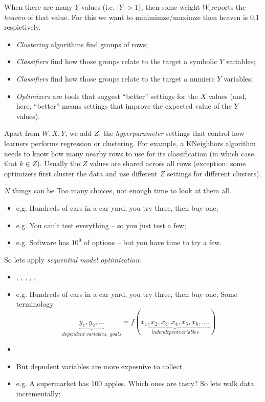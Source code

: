 \documentclass[twocolumn,landscape,9pt]{book}
\begin{document}
When there are many $Y$ values (i.e. $|Y|>1$), then some weight $W_i$reports
the {\em heaven} of that value. For this we want to minimimze/maximze then heaven is 0,1 respictively.
\begin{itemize}
\item
{\em Clustering} algorithms find groups of rows;
\item
{\em Classifiers} find how those groups relate to the target a symbolic $Y$ variables;
\item 
{\em Classifiers} find how those groups relate to the target a numierc $Y$ variables;
\item
{\em Optimizers}
are tools that suggest ``better'' settings
for the  $X$ values (and, here, ``better'' means settings that improve the expected value
of the  $Y$ values).
\end{itemize}
Apart from $W,X,Y$,  we add $Z$, the {\em hyperparameter} settings that control how learners performs regression or clustering.
For example, a KNeighbors algorithm needs
to know how many nearby rows to use for its classification (in which case, that $k\in Z$).
Usually the $Z$ values are shared across all rows (exception: some optimizers first cluster the data and use different $Z$
settings for different clusters).



$N$ things can be 
Too many choices, not enough time to look at them all.
\begin{itemize}
\item e.g. Hundreds of cars in a car yard, you try three, then buy one;
\item e.g. You can't test everything -- so you just test a few;
\item e.g. Software has $10^9$ of options -- but you  have time to try a few.
\end{itemize}
So lets apply {\em sequential model optimization}:
\begin{itemize}
\item \citet{xia2020sequential}, 
\citet{hutter2011sequential},
\citet{nair2018finding},
\citet{hsu2018arrow},
\citet{mockus1989bayesian},
\citet{golovin17}



\item e.g. Hundreds of cars in a car yard, you try three, then buy one;
Some terminology
\[ \underbrace{y_1,y_2,...}_{\mathit{}dependent\;variables,\;goals} = f(\underbrace{x_1, x_2, x_3, x_4, x_5, x_6,....}_{\mathit{indendepent variables}})
\]
\end{itemize}
\begin{itemize}
\item 
\item But depndent variables are more expesnive to collect 
\item e.g. A supermarket has 100 apples. Which ones are tasty?
So lets walk data incrementally:
\end{itemize}
\end{document}
